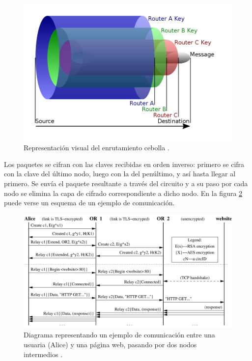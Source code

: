 \documentclass[
  a4paper,
  12pt,
  spanish,
]{scrartcl}
\begin{document}
\begin{figure}[h]
  \includegraphics[width=\textwidth]{OR4.png}
  \caption{Representación visual del enrutamiento cebolla \parencite{wikipedia:hantwister_svg_2008}.}
  \label{fig:or4}
\end{figure}

Los paquetes se cifran con las claves recibidas en orden inverso: primero se cifra con la clave del último nodo, luego con la del penúltimo, y así hasta llegar al primero. Se envía el paquete resultante a través del circuito y a su paso por cada nodo se elimina la capa de cifrado correspondiente a dicho nodo. En la figura \ref{fig:or5} puede verse un esquema de un ejemplo de comunicación.

\begin{figure}[h]
  \includegraphics[width=\textwidth]{OR5.png}
  \caption{Diagrama representando un ejemplo de comunicación entre una usuaria (Alice) y una página web, pasando por dos nodos intermedios \parencite{dingledine_tor:_2004}.}
  \label{fig:or5}
\end{figure}
\end{document}
